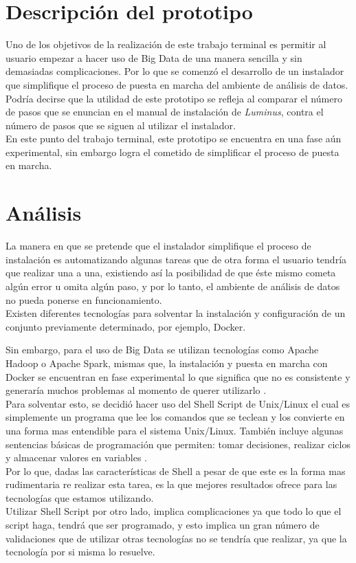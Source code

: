 \section{Descripción del prototipo}
Uno de los objetivos de la realización de este trabajo terminal es permitir al usuario empezar a hacer uso de Big Data de una manera sencilla y sin demasiadas complicaciones. Por lo que se comenzó el desarrollo de un instalador que simplifique el proceso de puesta en marcha del ambiente de análisis de datos.\\

Podría decirse que la utilidad de este prototipo se refleja al comparar el número de pasos que se enuncian en el manual de instalación de \emph{Luminus}, contra el número de pasos que se siguen al utilizar el instalador.\\

En este punto del trabajo terminal, este prototipo se encuentra en una fase aún experimental, sin embargo logra el 
cometido de simplificar el proceso de puesta en marcha.\\

\section{Análisis}
La manera en que se pretende que el instalador simplifique el proceso de instalación es automatizando algunas tareas que de otra forma el usuario tendría que realizar una a una, existiendo así la posibilidad de que éste mismo cometa algún error u omita algún paso, y por lo tanto, el ambiente de análisis de datos no pueda ponerse en funcionamiento.\\
Existen diferentes tecnologías para solventar la instalación y configuración de un conjunto previamente determinado, por ejemplo, Docker.

Sin embargo, para el uso de Big Data se utilizan tecnologías como Apache Hadoop o Apache Spark, mismas que, la instalación y puesta en marcha con Docker se encuentran en fase experimental lo que significa que no es consistente y generaría muchos problemas al momento de querer utilizarlo \cite{generacitapls}.   
\\
Para solventar esto, se decidió hacer uso del Shell Script de Unix/Linux el cual es simplemente un programa que lee los comandos que se teclean y los convierte en una forma mas entendible para el sistema Unix/Linux. También incluye algunas sentencias básicas de programación que permiten: tomar decisiones, realizar ciclos y almacenar valores en variables \cite{Baze}.
\\
Por lo que, dadas las características de Shell a pesar de que este es la forma mas rudimentaria re realizar esta tarea, es la que mejores resultados ofrece para las tecnologías que estamos utilizando.
\\
Utilizar Shell Script por otro lado, implica complicaciones ya que todo lo que el script haga, tendrá que ser programado, y esto implica un gran número de validaciones que de utilizar otras tecnologías no se tendría que realizar, ya que la tecnología por si misma lo resuelve.
